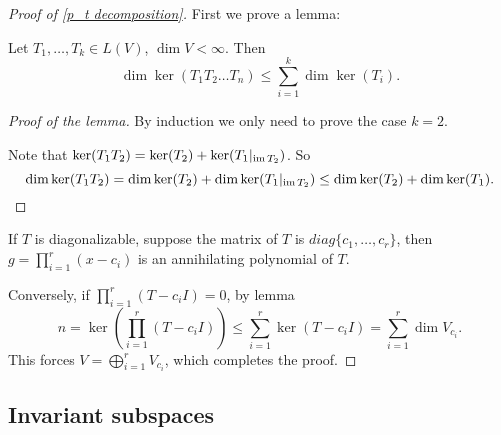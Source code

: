 \begin{proof}[Proof of \autoref{p_t decomposition}]
	First we prove a lemma:
	\begin{lemma}
		Let $T_1,\dots,T_k\in L(V)$, $\dim V<\infty$. Then
		\[
		\dim \ker(T_1T_2\dots T_n) \le \sum_{i=1}^{k} \dim \ker(T_i).
		\]
	\end{lemma}
	\begin{proof}[Proof of the lemma]
	    By induction we only need to prove the case $k=2$.

		Note that $\ker(T_1T_2) = \ker(T_2) + \ker(T_1|_{\operatorname{im} T_2})$.
		So
		\[
		\dim\ker(T_1T_2) = \dim\ker(T_2) + \dim\ker(T_1|_{\operatorname{im} T_2})
		\le \dim\ker(T_2) + \dim\ker(T_1).
		\]
	\end{proof}

	If $T$ is diagonalizable, suppose the matrix of $T$ is $diag\{c_1,\dots,c_r\}$,
	then $g=\prod_{i=1}^r (x-c_i)$ is an annihilating polynomial of $T$.

	Conversely, if $\prod_{i=1}^r (T - c_iI) = 0$, by lemma
	\[
	n = \ker \left( \prod_{i=1}^r (T-c_iI) \right) \le
	\sum_{i=1}^r \ker(T - c_iI) = \sum_{i=1}^r \dim V_{c_i}.
	\]
	This forces $V = \bigoplus_{i=1}^r V_{c_i}$, which completes the proof.
\end{proof}

\subsection{Invariant subspaces}
\label{sub:Invariant subspaces}


